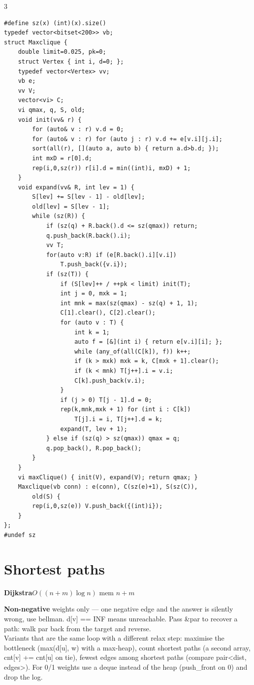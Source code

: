 \documentclass[9pt,a4paper]{extarticle}
\newcommand{\entry}[3]{%
  \addcontentsline{toc}{subsection}{#1}%
  \vspace{0.8ex}%
  \noindent\colorbox{hdbg}{\parbox{\dimexpr\columnwidth-2\fboxsep}{%
    \strut\textbf{#1}\hfill{\footnotesize\textsf{#2}}}}\par
  \vspace{0.4ex}%
  {\footnotesize #3\par}%
}
\newcommand{\code}[1]{{\ttfamily\small #1}}
\begin{document}
\begin{multicols*}{3}
\begin{lstlisting}
#define sz(x) (int)(x).size()
typedef vector<bitset<200>> vb;
struct Maxclique {
    double limit=0.025, pk=0;
    struct Vertex { int i, d=0; };
    typedef vector<Vertex> vv;
    vb e;
    vv V;
    vector<vi> C;
    vi qmax, q, S, old;
    void init(vv& r) {
        for (auto& v : r) v.d = 0;
        for (auto& v : r) for (auto j : r) v.d += e[v.i][j.i];
        sort(all(r), [](auto a, auto b) { return a.d>b.d; });
        int mxD = r[0].d;
        rep(i,0,sz(r)) r[i].d = min((int)i, mxD) + 1;
    }
    void expand(vv& R, int lev = 1) {
        S[lev] += S[lev - 1] - old[lev];
        old[lev] = S[lev - 1];
        while (sz(R)) {
            if (sz(q) + R.back().d <= sz(qmax)) return;
            q.push_back(R.back().i);
            vv T;
            for(auto v:R) if (e[R.back().i][v.i])
                T.push_back({v.i});
            if (sz(T)) {
                if (S[lev]++ / ++pk < limit) init(T);
                int j = 0, mxk = 1;
                int mnk = max(sz(qmax) - sz(q) + 1, 1);
                C[1].clear(), C[2].clear();
                for (auto v : T) {
                    int k = 1;
                    auto f = [&](int i) { return e[v.i][i]; };
                    while (any_of(all(C[k]), f)) k++;
                    if (k > mxk) mxk = k, C[mxk + 1].clear();
                    if (k < mnk) T[j++].i = v.i;
                    C[k].push_back(v.i);
                }
                if (j > 0) T[j - 1].d = 0;
                rep(k,mnk,mxk + 1) for (int i : C[k])
                    T[j].i = i, T[j++].d = k;
                expand(T, lev + 1);
            } else if (sz(q) > sz(qmax)) qmax = q;
            q.pop_back(), R.pop_back();
        }
    }
    vi maxClique() { init(V), expand(V); return qmax; }
    Maxclique(vb conn) : e(conn), C(sz(e)+1), S(sz(C)),
        old(S) {
        rep(i,0,sz(e)) V.push_back({(int)i});
    }
};
#undef sz
\end{lstlisting}

\section{Shortest paths}

\entry{Dijkstra}{$O((n + m) \log n)$ \quad mem $n + m$}{%
\textbf{Non-negative} weights only --- one negative edge and the answer is silently
wrong, use \code{bellman}. \code{d[v] == INF} means unreachable. Pass \code{\&par} to
recover a path: walk \code{par} back from the target and reverse.\\[0.3ex]
Variants that are the same loop with a different relax step: maximise the bottleneck
(\code{max(d[u], w)} with a max-heap), count shortest paths (a second array,
\code{cnt[v] += cnt[u]} on tie), fewest edges among shortest paths (compare
\code{pair<dist, edges>}). For 0/1 weights use a \code{deque} instead of the heap
(push\_front on 0) and drop the log.}


\end{multicols*}
\end{document}
